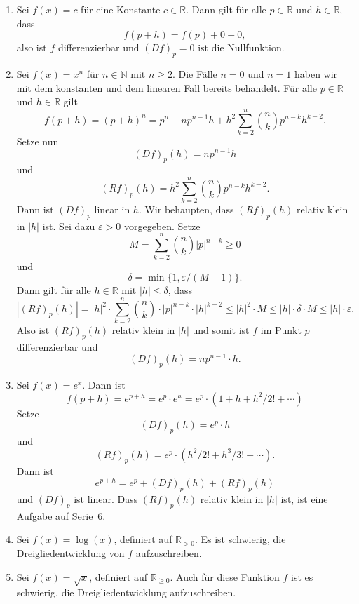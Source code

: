 \documentclass[../main.tex]{subfiles}
\begin{document}
\begin{examples}
  \leavevmode
  \begin{enumerate}[(1)]
    \item Sei $f(x) = c$ für eine
      Konstante $c \in \mathbb{R}$.
      Dann gilt für alle $p \in \mathbb{R}$ 
      und $h \in \mathbb{R}$, dass
      \[
        f(p + h) = f(p) + 0 + 0,
      \]
      also ist $f$ differenzierbar und
      ${(Df)}_p = 0$ ist die Nullfunktion.
    \item Sei $f(x) = x^n$ für $n \in \mathbb{N}$
      mit $n \geq 2$. Die Fälle $n = 0$ und $n = 1$ 
      haben wir mit dem konstanten und dem linearen
      Fall bereits behandelt.
      Für alle $p \in \mathbb{R}$ und
      $h \in \mathbb{R}$ gilt
      \[
        f(p + h) = {(p + h)}^n
        = p^n + np^{n-1}h + h^2 \sum_{k=2}^{n} \binom{n}{k}
        p^{n-k}h^{k-2}.
      \]
      Setze nun
      \[
        {(Df)}_p(h) = np^{n-1}h
      \]
      und
      \[
        {(Rf)}_p(h) = h^2 \sum_{k=2}^{n} \binom{n}{k} p^{n-k}h^{k-2}.
      \]
      Dann ist ${(Df)}_p$ linear in $h$.
      Wir behaupten, dass ${(Rf)}_p(h)$ relativ
      klein in $|h|$ ist.
      Sei dazu $\varepsilon > 0$ vorgegeben.
      Setze
      \[
        M = \sum_{k=2}^{n} \binom{n}{k}|p|^{n-k} \geq 0
      \]
      und
      \[
        \delta = \min \{1, \varepsilon / (M + 1)\}.
      \]
      Dann gilt für alle $h \in \mathbb{R}$ 
      mit $|h| \leq \delta$,
      dass
      \[
        |{(Rf)}_p(h)| = |h|^2 \cdot \sum_{k=2}^{n} 
        \binom{n}{k} \cdot |p|^{n-k} \cdot |h|^{k-2}
                 \leq |h|^2 \cdot M %
                 \leq |h| \cdot \delta \cdot M 
                 \leq|h| \cdot  \varepsilon.
      \]
      Also ist ${(Rf)}_p(h)$ relativ klein in $|h|$ 
      und somit ist $f$ im Punkt $p$ differenzierbar und
      \[
        {(Df)}_p(h) = n p^{n-1} \cdot h.
      \]
    \item Sei $f(x) = e^x$. Dann ist
      \[
        f(p + h) = e^{p+h} = e^p \cdot e^h
        = e^p \cdot (1  +h + h^2/2! + \cdots)
      \]
      Setze
      \[
        {(Df)}_p(h) = e^p \cdot h
      \]
      und
      \[
        {(Rf)}_p(h) = e^p \cdot (h^2/2! + h^3/3! + \cdots).
      \]
      Dann ist
      \[
        e^{p+h} = e^p + {(Df)}_p(h) + {(Rf)}_p(h)
      \]
      und ${(Df)}_p$ ist linear.
      Dass ${(Rf)}_p(h)$ relativ klein
      in $|h|$ ist, ist eine Aufgabe auf Serie~6.
    \item Sei $f(x) = \log(x)$, definiert auf
      $\mathbb{R}_{>0}$.
      Es ist schwierig, die Dreigliedentwicklung
      von $f$ aufzuschreiben.
    \item Sei $f(x) = \sqrt x$, definiert auf
      $\mathbb{R}_{\geq 0}$.
      Auch für diese Funktion $f$ ist es schwierig,
      die Dreigliedentwicklung aufzuschreiben.
  \end{enumerate}
\end{examples}
\end{document}
